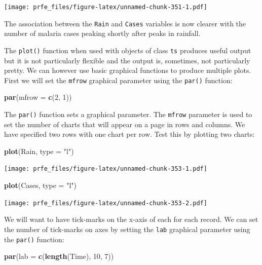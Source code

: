 \documentclass[12pt,a4paper]{book}
\newenvironment{Shaded}{\begin{snugshade}}{\end{snugshade}}
\newcommand{\DataTypeTok}[1]{\textcolor[rgb]{0.13,0.29,0.53}{#1}}
\newcommand{\DecValTok}[1]{\textcolor[rgb]{0.00,0.00,0.81}{#1}}
\newcommand{\KeywordTok}[1]{\textcolor[rgb]{0.13,0.29,0.53}{\textbf{#1}}}
\newcommand{\NormalTok}[1]{#1}
\newcommand{\StringTok}[1]{\textcolor[rgb]{0.31,0.60,0.02}{#1}}
\theoremstyle{definition}
\theoremstyle{definition}
\theoremstyle{definition}
\theoremstyle{remark}
\begin{document}
\texttt{[image: prfe\_files/figure-latex/unnamed-chunk-351-1.pdf]}

The association between the \texttt{Rain} and \texttt{Cases} variables
is now clearer with the number of malaria cases peaking shortly after
peaks in rainfall.

The \texttt{plot()} function when used with objects of class \texttt{ts}
produces useful output but it is not particularly flexible and the
output is, sometimes, not particularly pretty. We can however use basic
graphical functions to produce multiple plots. First we will set the
\texttt{mfrow} graphical parameter using the \texttt{par()} function:

\begin{Shaded}
\begin{Highlighting}[]
\KeywordTok{par}\NormalTok{(}\DataTypeTok{mfrow =} \KeywordTok{c}\NormalTok{(}\DecValTok{2}\NormalTok{, }\DecValTok{1}\NormalTok{))}
\end{Highlighting}
\end{Shaded}

The \texttt{par()} function sets a graphical parameter. The
\texttt{mfrow} parameter is used to set the number of charts that will
appear on a page in rows and columns. We have specified two rows with
one chart per row. Test this by plotting two charts:

\begin{Shaded}
\begin{Highlighting}[]
\KeywordTok{plot}\NormalTok{(Rain, }\DataTypeTok{type =} \StringTok{"l"}\NormalTok{)}
\end{Highlighting}
\end{Shaded}

\texttt{[image: prfe\_files/figure-latex/unnamed-chunk-353-1.pdf]}

\begin{Shaded}
\begin{Highlighting}[]
\KeywordTok{plot}\NormalTok{(Cases, }\DataTypeTok{type =} \StringTok{"l"}\NormalTok{)}
\end{Highlighting}
\end{Shaded}

\texttt{[image: prfe\_files/figure-latex/unnamed-chunk-353-2.pdf]}

We will want to have tick-marks on the x-axis of each for each record.
We can set the number of tick-marks on axes by setting the \texttt{lab}
graphical parameter using the \texttt{par()} function:

\begin{Shaded}
\begin{Highlighting}[]
\KeywordTok{par}\NormalTok{(}\DataTypeTok{lab =} \KeywordTok{c}\NormalTok{(}\KeywordTok{length}\NormalTok{(Time), }\DecValTok{10}\NormalTok{, }\DecValTok{7}\NormalTok{))}
\end{Highlighting}
\end{Shaded}
\end{document}
